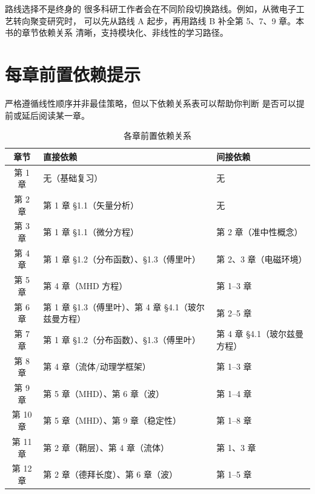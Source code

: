 \documentclass[12pt,a4paper,openany,oneside]{book}
\begin{document}
\begin{insight}{路线选择不是终身的}{}
很多科研工作者会在不同阶段切换路线。例如，从微电子工艺转向聚变研究时，
可以先从路线 A 起步，再用路线 B 补全第 5、7、9 章。本书的章节依赖关系
清晰，支持模块化、非线性的学习路径。
\end{insight}


\section*{每章前置依赖提示}

严格遵循线性顺序并非最佳策略，但以下依赖关系表可以帮助你判断
是否可以提前或延后阅读某一章。

\begin{table}[htbp]
\centering
\caption{各章前置依赖关系}
\small
\begin{tabular}{@{}cp{6.4cm}p{4.6cm}@{}}
\toprule
\textbf{章节} & \textbf{直接依赖} & \textbf{间接依赖} \\
\midrule
第 1 章 & 无（基础复习） & 无 \\
第 2 章 & 第 1 章 \S 1.1（矢量分析） & 无 \\
第 3 章 & 第 1 章 \S 1.1（微分方程） & 第 2 章（准中性概念） \\
第 4 章 & 第 1 章 \S 1.2（分布函数）、\S 1.3（傅里叶） & 第 2、3 章（电磁环境） \\
第 5 章 & 第 4 章（MHD 方程） & 第 1--3 章 \\
第 6 章 & 第 1 章 \S 1.3（傅里叶）、第 4 章 \S 4.1（玻尔兹曼方程） & 第 2--5 章 \\
第 7 章 & 第 1 章 \S 1.2（分布函数）、\S 1.3（傅里叶） & 第 4 章 \S 4.1（玻尔兹曼方程） \\
第 8 章 & 第 4 章（流体/动理学框架） & 第 1--3 章 \\
第 9 章 & 第 5 章（MHD）、第 6 章（波） & 第 1--4 章 \\
第 10 章 & 第 5 章（MHD）、第 9 章（稳定性） & 第 1--8 章 \\
第 11 章 & 第 2 章（鞘层）、第 4 章（流体） & 第 1、3 章 \\
第 12 章 & 第 2 章（德拜长度）、第 6 章（波） & 第 1--5 章 \\
\bottomrule
\end{tabular}
\end{table}
\end{document}

